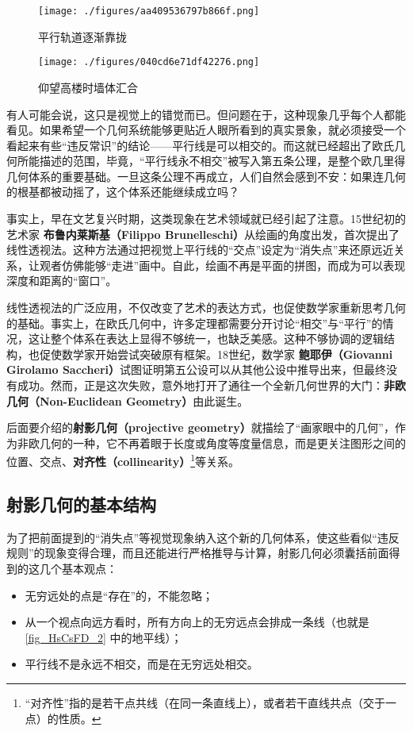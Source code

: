 \begin{figure}[ht]
\centering
\texttt{[image: ./figures/aa409536797b866f.png]}
\caption{平行轨道逐渐靠拢} \label{fig_HsCsFD_2}
\end{figure}

\begin{figure}[ht]
\centering
\texttt{[image: ./figures/040cd6e71df42276.png]}
\caption{仰望高楼时墙体汇合} \label{fig_HsCsFD_3}
\end{figure}

有人可能会说，这只是视觉上的错觉而已。但问题在于，这种现象几乎每个人都能看见。如果希望一个几何系统能够更贴近人眼所看到的真实景象，就必须接受一个看起来有些“违反常识”的结论——平行线是可以相交的。而这就已经超出了欧氏几何所能描述的范围，毕竟，“平行线永不相交”被写入第五条公理，是整个欧几里得几何体系的重要基础。一旦这条公理不再成立，人们自然会感到不安：如果连几何的根基都被动摇了，这个体系还能继续成立吗？

事实上，早在文艺复兴时期，这类现象在艺术领域就已经引起了注意。15世纪初的艺术家 \textbf{布鲁内莱斯基（Filippo Brunelleschi）}从绘画的角度出发，首次提出了线性透视法。这种方法通过把视觉上平行线的“交点”设定为“消失点”来还原远近关系，让观者仿佛能够“走进”画中。自此，绘画不再是平面的拼图，而成为可以表现深度和距离的“窗口”。

线性透视法的广泛应用，不仅改变了艺术的表达方式，也促使数学家重新思考几何的基础。事实上，在欧氏几何中，许多定理都需要分开讨论“相交”与“平行”的情况，这让整个体系在表达上显得不够统一，也缺乏美感。这种不够协调的逻辑结构，也促使数学家开始尝试突破原有框架。18世纪，数学家 \textbf{鲍耶伊（Giovanni Girolamo Saccheri）}试图证明第五公设可以从其他公设中推导出来，但最终没有成功。然而，正是这次失败，意外地打开了通往一个全新几何世界的大门：\textbf{非欧几何（Non-Euclidean Geometry）}由此诞生。

后面要介绍的\textbf{射影几何（projective geometry）}就描绘了“画家眼中的几何”，作为非欧几何的一种，它不再着眼于长度或角度等度量信息，而是更关注图形之间的位置、交点、\textbf{对齐性（collinearity）}\footnote{“对齐性”指的是若干点共线（在同一条直线上），或者若干直线共点（交于一点）的性质。}等关系。

\subsection{射影几何的基本结构}

为了把前面提到的“消失点”等视觉现象纳入这个新的几何体系，使这些看似“违反规则”的现象变得合理，而且还能进行严格推导与计算，射影几何必须囊括前面得到的这几个基本观点：
\begin{itemize}
\item 无穷远处的点是“存在”的，不能忽略；
\item 从一个视点向远方看时，所有方向上的无穷远点会排成一条线（也就是\autoref{fig_HsCsFD_2} 中的地平线）；
\item 平行线不是永远不相交，而是在无穷远处相交。
\end{itemize}

